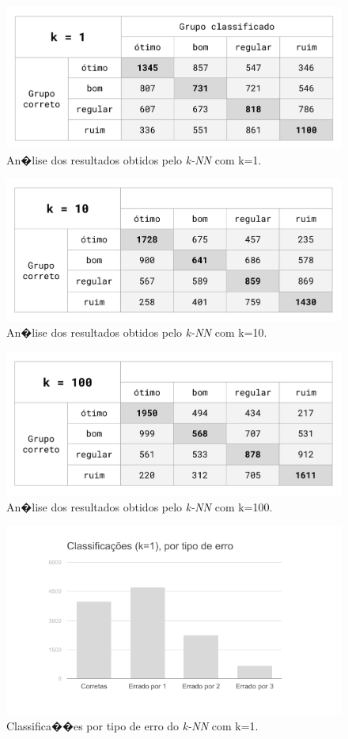 \documentclass[12pt]{article}
\begin{document}
\begin{figure}[H]
\centering\includegraphics[width=.60\linewidth]{plot-white1.png}
\caption{An�lise dos resultados obtidos pelo \emph{k-NN} com k=1.}
\label{fig:tab1}
\end{figure}

\begin{figure}[H]
\centering\includegraphics[width=.60\linewidth]{plot-white10.png}
\caption{An�lise dos resultados obtidos pelo \emph{k-NN} com k=10.}
\label{fig:tab10}
\end{figure}

\begin{figure}[H]
\centering\includegraphics[width=.60\linewidth]{plot-white100.png}
\caption{An�lise dos resultados obtidos pelo \emph{k-NN} com k=100.}
\label{fig:tab100}
\end{figure}

\begin{figure}[H]
\centering\includegraphics[width=.65\linewidth]{graf-white1.png}
\caption{Classifica��es por tipo de erro do \emph{k-NN} com k=1.}
\label{fig:graf1}
\end{figure}
\end{document}
